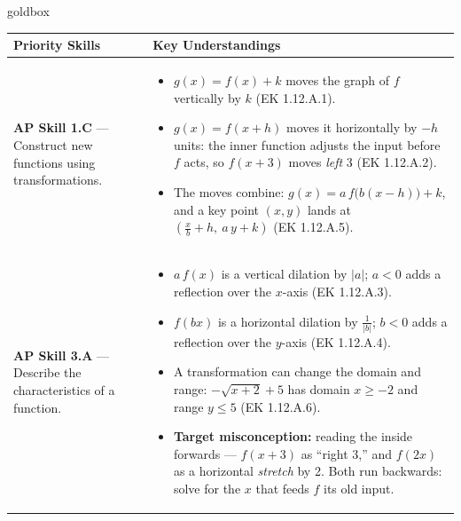 \documentclass[10pt]{article}
\begin{document}
\renewcommand{\arraystretch}{1.6}
\begin{skillbox}{goldbox}
\begin{tabularx}{\linewidth}{@{}X X@{}}
\textbf{Priority Skills} &
\textbf{Key Understandings} \\
\midrule
\textbf{AP Skill 1.C} --- Construct new functions using transformations. &
\begin{itemize}[leftmargin=1.2em,itemsep=2pt,topsep=0pt]
  \item $g(x) = f(x) + k$ moves the graph of $f$ vertically by $k$ (EK 1.12.A.1).
  \item $g(x) = f(x + h)$ moves it horizontally by $-h$ units: the inner function adjusts the
        input before $f$ acts, so $f(x + 3)$ moves \emph{left} 3 (EK 1.12.A.2).
  \item The moves combine: $g(x) = a\,f\big(b(x - h)\big) + k$, and a key point
        $(x, y)$ lands at $\left(\tfrac{x}{b} + h,\ a\,y + k\right)$ (EK 1.12.A.5).
\end{itemize} \\
\textbf{AP Skill 3.A} --- Describe the characteristics of a function. &
\begin{itemize}[leftmargin=1.2em,itemsep=2pt,topsep=0pt]
  \item $a\,f(x)$ is a vertical dilation by $|a|$; $a < 0$ adds a reflection over the
        $x$-axis (EK 1.12.A.3).
  \item $f(bx)$ is a horizontal dilation by $\tfrac{1}{|b|}$; $b < 0$ adds a reflection over
        the $y$-axis (EK 1.12.A.4).
  \item A transformation can change the domain and range: $-\sqrt{x + 2} + 5$ has domain
        $x \ge -2$ and range $y \le 5$ (EK 1.12.A.6).
  \item \textbf{Target misconception:} reading the inside forwards --- $f(x + 3)$ as
        ``right 3,'' and $f(2x)$ as a horizontal \emph{stretch} by 2. Both run backwards: solve
        for the $x$ that feeds $f$ its old input.
\end{itemize} \\
\end{tabularx}
\end{skillbox}
\end{document}
